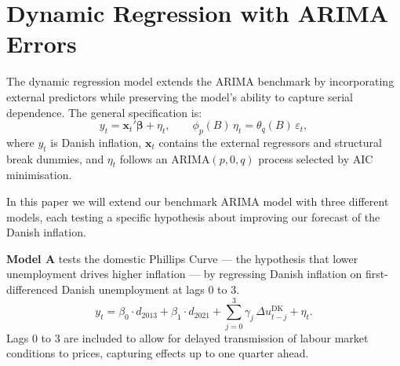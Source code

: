 





\section{Dynamic Regression with ARIMA Errors}

The dynamic regression model extends the ARIMA benchmark by incorporating external predictors while preserving the model's ability to capture serial dependence. The general specification is:
\[
y_t = \mathbf{x}_t'\boldsymbol{\beta} + \eta_t, \qquad
\phi_p(B)\,\eta_t = \theta_q(B)\,\varepsilon_t,
\]
where $y_t$ is Danish inflation, $\mathbf{x}_t$ contains the external regressors and structural break dummies, and $\eta_t$ follows an ARIMA$(p,0,q)$ process selected by AIC minimisation. 

In this paper we will extend our benchmark ARIMA model with three different models, each testing a specific hypothesis about improving our forecast of the Danish inflation.

\textbf{Model A} tests the domestic Phillips Curve — the hypothesis that lower unemployment drives higher inflation — by regressing Danish inflation on first-differenced Danish unemployment at lags 0 to 3.
\[
y_t = \beta_0 \cdot d_{2013} + \beta_1 \cdot d_{2021} +
\sum_{j=0}^{3} \gamma_j\,\Delta u^{\text{DK}}_{t-j} + \eta_t.
\]
Lags 0 to 3 are included to allow for delayed transmission of labour market conditions to prices, capturing effects up to one quarter ahead.

